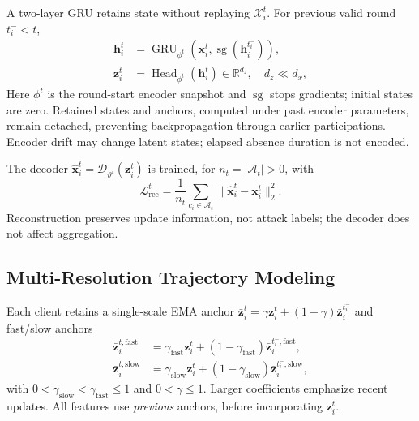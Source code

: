 A two-layer GRU retains state without replaying $\mathcal X_i^t$. For previous valid round $t_i^-<t$,
\begin{equation}
\begin{aligned}
\mathbf{h}_i^t&=\operatorname{GRU}_{\phi^t}\!\left(\mathbf{x}_i^t,\operatorname{sg}(\mathbf{h}_i^{t_i^-})\right),\\
\mathbf{z}_i^t&=\operatorname{Head}_{\phi^t}(\mathbf{h}_i^t)\in\mathbb R^{d_z},\quad d_z\ll d_x,
\end{aligned}
\label{eq:method_online_encoder}
\end{equation}
Here $\phi^t$ is the round-start encoder snapshot and $\operatorname{sg}$ stops gradients; initial states are zero. Retained states and anchors, computed under past encoder parameters, remain detached, preventing backpropagation through earlier participations. Encoder drift may change latent states; elapsed absence duration is not encoded.

The decoder $\widehat{\mathbf{x}}_i^t=\mathcal{D}_{\vartheta^t}(\mathbf{z}_i^t)$ is trained, for $n_t=|\mathcal{A}_t|>0$, with
\begin{equation}
\mathcal{L}_{\mathrm{rec}}^t=\frac{1}{n_t}\sum_{c_i\in\mathcal{A}_t}\|\widehat{\mathbf{x}}_i^t-\mathbf{x}_i^t\|_2^2.
\label{eq:method_rec_loss}
\end{equation}
Reconstruction preserves update information, not attack labels; the decoder does not affect aggregation.

\subsection{Multi-Resolution Trajectory Modeling}
\label{subsec:method_multi_resolution}

Each client retains a single-scale EMA anchor $\bar{\mathbf z}_i^t=\gamma\mathbf z_i^t+(1-\gamma)\bar{\mathbf z}_i^{t_i^-}$ and fast/slow anchors
\begin{equation}
\begin{aligned}
\bar{\mathbf{z}}_i^{t,\mathrm{fast}}&=\gamma_{\mathrm{fast}}\mathbf{z}_i^t+(1-\gamma_{\mathrm{fast}})\bar{\mathbf{z}}_i^{t_i^-,\mathrm{fast}},\\
\bar{\mathbf{z}}_i^{t,\mathrm{slow}}&=\gamma_{\mathrm{slow}}\mathbf{z}_i^t+(1-\gamma_{\mathrm{slow}})\bar{\mathbf{z}}_i^{t_i^-,\mathrm{slow}},
\end{aligned}
\label{eq:method_fast_slow}
\end{equation}
with $0<\gamma_{\mathrm{slow}}<\gamma_{\mathrm{fast}}\leq1$ and $0<\gamma\leq1$. Larger coefficients emphasize recent updates. All features use \emph{previous} anchors, before incorporating $\mathbf z_i^t$.

